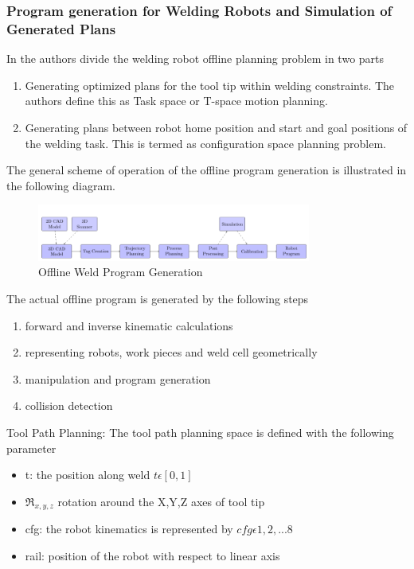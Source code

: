 \subsubsection{Program generation for Welding Robots and Simulation of Generated Plans}
In \cite{14} the authors divide the welding robot offline planning problem in two parts
\begin{enumerate}
\item Generating optimized plans for the tool tip within welding constraints. The authors define this as Task space or T-space motion planning.
\item Generating plans between robot home position and start and goal positions of the welding task. This is termed as configuration space planning problem.
\end{enumerate}
The general scheme of operation of the offline program generation is illustrated in the following diagram.
\begin{figure}[htbp] %
 \centering
   \includegraphics[width=9cm]{images/cadgen_model.png}
   \caption[Offline Weld Program Generation]
   {Offline Weld Program Generation \footnotemark[\value{footnote}]}  
\label{fig:img7}
\end{figure}
\newpage
The actual offline program is generated by the following steps
\begin{enumerate}
\item forward and inverse kinematic calculations
\item representing robots, work pieces and weld cell geometrically
\item manipulation and program generation
\item collision detection
\end{enumerate}
Tool Path Planning: The tool path planning space is defined with the following parameter
\begin{itemize}
\item t: the position along weld $t \epsilon [0,1]$
\item $\Re_{x,y,z} $ rotation around the X,Y,Z axes of tool tip
\item cfg: the robot kinematics is represented by $cfg \epsilon {1,2,...8}$
\item rail: position of the robot with respect to linear axis 
\end{itemize}
